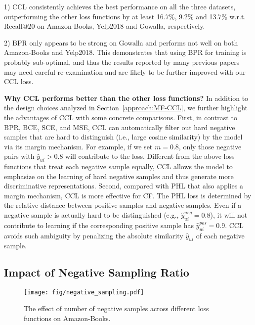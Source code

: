 \documentclass[sigconf,authorversion]{acmart}
\begin{document}
1) CCL consistently achieves the best performance on all the three datasets, outperforming the other loss functions by at least 16.7\%, 9.2\% and 13.7\% w.r.t. Recall@20 on Amazon-Books, Yelp2018 and Gowalla, respectively.
    
2) BPR only appears to be strong on Gowalla and performs not well on both Amazon-Books and Yelp2018. This demonstrates that using BPR for training is probably sub-optimal, and thus the results reported by many previous papers may need careful re-examination and are likely to be further improved with our CCL loss. 


\textbf{Why CCL performs better than the other loss functions?} 
In addition to the design choices analyzed in Section~\ref{approach:MF-CCL}, we further highlight the advantages of CCL with some concrete comparisons.
First, in contrast to BPR, BCE, SCE, and MSE, CCL can automatically filter out hard negative samples that are hard to distinguish (i.e., large cosine similarity) by the model via its margin mechanism. For example, if we set $m = 0.8$, only those negative pairs with $\hat{y}_{ui} > 0.8$ will contribute to the loss. Different from the above loss functions that treat each negative sample equally, CCL allows the model to emphasize on the learning of hard negative samples and thus generate more discriminative representations.
Second, compared with PHL that also applies a margin mechanism, CCL is more effective for CF. The PHL loss is determined by the relative distance between positive samples and negative samples. Even if a negative sample is actually hard to be distinguished (e.g., $\hat{y}^{neg}_{ui}=0.8$), it will not contribute to learning if the corresponding positive sample has $\hat{y}^{pos}_{ui}=0.9$. CCL avoids such ambiguity by penalizing the absolute similarity $\hat{y}_{ui}$ of each negative sample.









\subsection{Impact of Negative Sampling Ratio}\label{subsec:negSampRatio}

\begin{figure}[!t]
    \begin{center}
\texttt{[image: fig/negative\_sampling.pdf]}
    \end{center}
    \vspace{-2ex}
    \caption{The effect of number of negative samples across different loss functions on Amazon-Books.}
    \label{fig:num_negs}
    \vspace{-0.5cm}
\end{figure}
\end{document}
